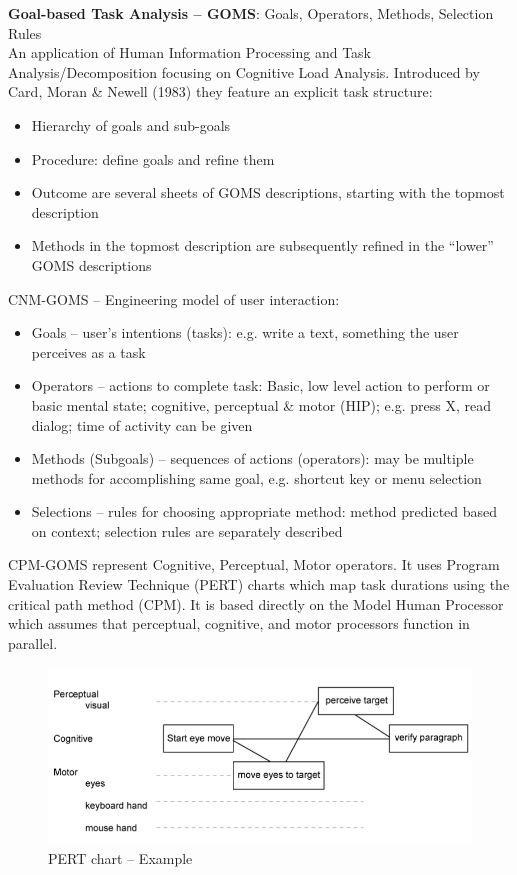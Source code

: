 \textbf{Goal-based Task Analysis -- GOMS}: Goals, Operators, Methods, Selection Rules\\
An application of Human Information Processing and Task Analysis/Decomposition focusing on Cognitive Load Analysis. Introduced by Card, Moran \& Newell (1983) they feature an explicit task structure:
\begin{itemize}
\item Hierarchy of goals and sub-goals
\item Procedure: define goals and refine them
\item Outcome are several sheets of GOMS descriptions, starting with the topmost description
\item Methods in the topmost description are subsequently refined in the ``lower'' GOMS descriptions
\end{itemize}
CNM-GOMS -- Engineering model of user interaction:
\begin{itemize}
\item Goals -- user's intentions (tasks): e.g. write a text, something the user perceives as a task
\item Operators -- actions to complete task: Basic, low level action to perform or basic mental state; cognitive, perceptual \& motor (HIP); e.g. press X, read dialog; time of activity can be given
\item Methods (Subgoals) -- sequences of actions (operators): may be multiple methods for accomplishing same goal, e.g. shortcut key or menu selection
\item Selections -- rules for choosing appropriate method: method predicted based on context; selection rules are separately described
\end{itemize}
CPM-GOMS represent Cognitive, Perceptual, Motor operators. It uses Program Evaluation Review Technique (PERT) charts which map task durations using the critical path method (CPM). It is based directly on the Model Human Processor which assumes that perceptual, cognitive, and motor processors function in parallel.
\begin{figure}[h!]
	\centering
	\includegraphics[width=.5\textwidth]{img/ch05_pert.png}
	\caption{PERT chart -- Example}
	\label{pert}
\end{figure}

